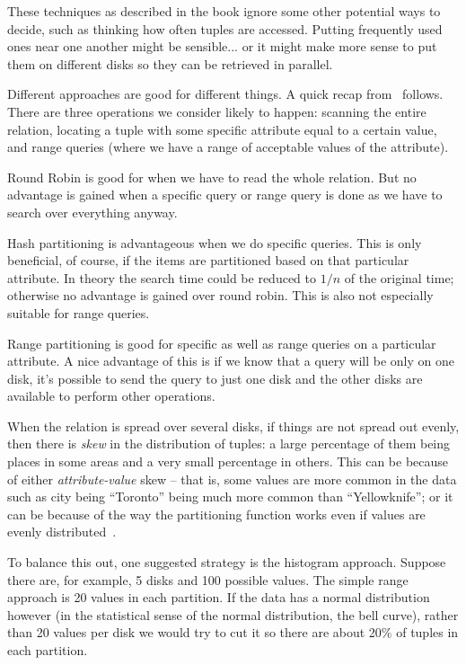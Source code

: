 \documentclass[a4paper]{report}
\begin{document}
These techniques as described in the book ignore some other potential ways to decide, such as thinking how often tuples are accessed. Putting frequently used ones near one another might be sensible... or it might make more sense to put them on different disks so they can be retrieved in parallel.

Different approaches are good for different things. A quick recap from~\cite{dsc} follows. There are three operations we consider likely to happen: scanning the entire relation, locating a tuple with some specific attribute equal to a certain value, and range queries (where we have a range of acceptable values of the attribute).

Round Robin is good for when we have to read the whole relation. But no advantage is gained when a specific query or range query is done as we have to search over everything anyway.

Hash partitioning is advantageous when we do specific queries. This is only beneficial, of course, if the items are partitioned based on that particular attribute. In theory the search time could be reduced to $1/n$ of the original time; otherwise no advantage is gained over round robin. This is also not especially suitable for range queries.

Range partitioning is good for specific as well as range queries on a particular attribute. A nice advantage of this is if we know that a query will be only on one disk, it's possible to send the query to just one disk and the other disks are available to perform other operations.

When the relation is spread over several disks, if things are not spread out evenly, then there is \textit{skew} in the distribution of tuples: a large percentage of them being places in some areas and a very small percentage in others. This can be because of either \textit{attribute-value} skew -- that is, some values are more common in the data such as city being ``Toronto'' being much more common than ``Yellowknife''; or it can be because of the way the partitioning function works even if values are evenly distributed~\cite{dsc}.

To balance this out, one suggested strategy is the histogram approach. Suppose there are, for example, 5 disks and 100 possible values. The simple range approach is 20 values in each partition. If the data has a normal distribution however (in the statistical sense of the normal distribution, the bell curve), rather than 20 values per disk we would try to cut it so there are about 20\% of tuples in each partition.
\end{document}
